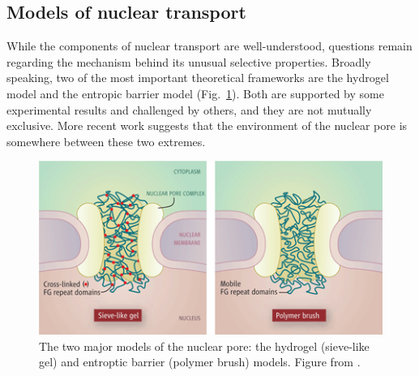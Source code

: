 %
%
%
%

\subsection{Models of nuclear transport}

While the components of nuclear transport are well-understood, questions remain regarding the mechanism behind its unusual selective properties.  Broadly speaking, two of the most important theoretical frameworks are the hydrogel model and the entropic barrier model (Fig.~\ref{fig:hydrogel-entropic-brush}).  Both are supported by some experimental results and challenged by others, and they are not mutually exclusive.  More recent work suggests that the environment of the nuclear pore is somewhere between these two extremes.

\begin{figure}
\centering
\includegraphics[width=0.6\linewidth]{figs/ch01/elbaum}
\caption[Two important models of nuclear transport.]{The two major models of the nuclear pore: the hydrogel (sieve-like gel) and entroptic barrier (polymer brush) models. Figure from \cite{elbaum06}.}
\label{fig:hydrogel-entropic-brush}
\end{figure}

